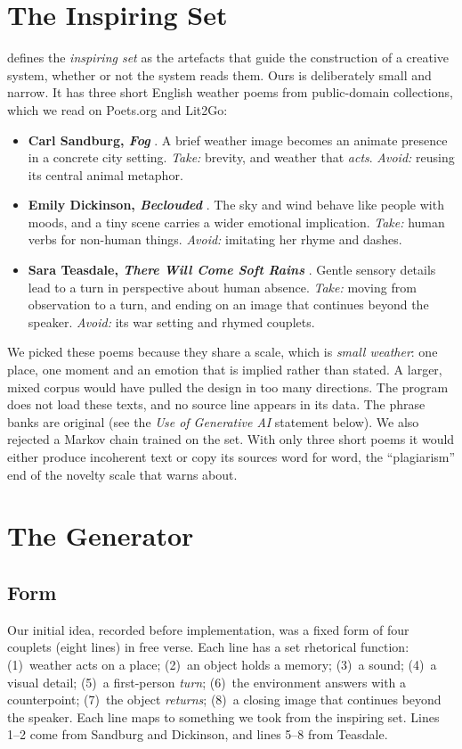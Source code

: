 \documentclass[letterpaper]{article}
\begin{document}
\section{The Inspiring Set}
\citet{ritchie2007} defines the \emph{inspiring set} as the artefacts
that guide the construction of a creative system, whether or not the
system reads them. Ours is deliberately small and narrow. It has three
short English weather poems from public-domain collections, which we
read on Poets.org and Lit2Go:
\begin{itemize}\itemsep 0pt
\item \textbf{Carl Sandburg, \emph{Fog}} \citep{sandburg1916}. A brief
weather image becomes an animate presence in a concrete city setting.
\emph{Take:} brevity, and weather that \emph{acts}. \emph{Avoid:}
reusing its central animal metaphor.
\item \textbf{Emily Dickinson, \emph{Beclouded}} \citep{dickinson1890}.
The sky and wind behave like people with moods, and a tiny scene
carries a wider emotional implication. \emph{Take:} human verbs for
non-human things. \emph{Avoid:} imitating her rhyme and dashes.
\item \textbf{Sara Teasdale, \emph{There Will Come Soft Rains}}
\citep{teasdale1920}. Gentle sensory details lead to a turn in
perspective about human absence. \emph{Take:} moving from observation
to a turn, and ending on an image that continues beyond the speaker.
\emph{Avoid:} its war setting and rhymed couplets.
\end{itemize}
We picked these poems because they share a scale, which is \emph{small
weather}: one place, one moment and an emotion that is implied rather
than stated. A larger, mixed corpus would have pulled the design in too
many directions. The program does not load these texts, and no source
line appears in its data. The phrase banks are original (see the
\emph{Use of Generative AI} statement below). We also rejected a Markov
chain trained on the set. With only three short poems it would either
produce incoherent text or copy its sources word for word, the
``plagiarism'' end of the novelty scale that \citet{ritchie2007}
warns about.

\section{The Generator}
\subsection{Form}
Our initial idea, recorded before implementation, was a fixed form of
four couplets (eight lines) in free verse. Each line has a set rhetorical
function: (1)~weather acts on a place; (2)~an object holds a memory;
(3)~a sound; (4)~a visual detail; (5)~a first-person \emph{turn};
(6)~the environment answers with a counterpoint; (7)~the object
\emph{returns}; (8)~a closing image that continues beyond the speaker.
Each line maps to something we took from the inspiring set. Lines 1--2
come from Sandburg and Dickinson, and lines 5--8 from Teasdale.
\end{document}
